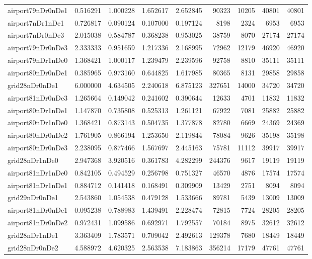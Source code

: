 \begin{longtable}{|l|r|r|r|r|r|r|r|r|}
airport79nDr0nDe1 & 0.516291 & 1.000228 & 1.652617 & 2.652845 & 90323 & 10205 & 40801 & 40801 \\
airport7nDr1nDe1 & 0.726817 & 0.090124 & 0.107000 & 0.197124 & 8198 & 2324 & 6953 & 6953 \\
airport7nDr0nDe3 & 2.015038 & 0.584787 & 0.368238 & 0.953025 & 38759 & 8070 & 27174 & 27174 \\
airport79nDr0nDe3 & 2.333333 & 0.951659 & 1.217336 & 2.168995 & 72962 & 12179 & 46920 & 46920 \\
airport79nDr1nDe0 & 1.368421 & 1.000117 & 1.239479 & 2.239596 & 92758 & 8810 & 35111 & 35111 \\
airport80nDr0nDe1 & 0.385965 & 0.973160 & 0.644825 & 1.617985 & 80365 & 8131 & 29858 & 29858 \\
grid28nDr0nDe1 & 6.000000 & 4.634505 & 2.240618 & 6.875123 & 327651 & 14000 & 34720 & 34720 \\
airport81nDr0nDe3 & 1.265664 & 0.149042 & 0.241602 & 0.390644 & 12633 & 4701 & 11832 & 11832 \\
airport80nDr1nDe1 & 1.147870 & 0.735808 & 0.525313 & 1.261121 & 67922 & 7081 & 25882 & 25882 \\
airport80nDr1nDe0 & 1.368421 & 0.873143 & 0.504735 & 1.377878 & 82780 & 6669 & 24369 & 24369 \\
airport80nDr0nDe2 & 1.761905 & 0.866194 & 1.253650 & 2.119844 & 78084 & 9626 & 35198 & 35198 \\
airport80nDr0nDe3 & 2.238095 & 0.877466 & 1.567697 & 2.445163 & 75781 & 11112 & 39917 & 39917 \\
grid28nDr1nDe0 & 2.947368 & 3.920516 & 0.361783 & 4.282299 & 244376 & 9617 & 19119 & 19119 \\
airport81nDr1nDe0 & 0.842105 & 0.494529 & 0.256798 & 0.751327 & 46570 & 4876 & 17574 & 17574 \\
airport81nDr1nDe1 & 0.884712 & 0.141418 & 0.168491 & 0.309909 & 13429 & 2751 & 8094 & 8094 \\
grid29nDr0nDe1 & 2.543860 & 1.054538 & 0.479128 & 1.533666 & 89781 & 5439 & 13009 & 13009 \\
airport81nDr0nDe1 & 0.095238 & 0.788983 & 1.439491 & 2.228474 & 72815 & 7724 & 28205 & 28205 \\
airport81nDr0nDe2 & 0.972431 & 1.099586 & 0.692971 & 1.792557 & 70184 & 8975 & 32612 & 32612 \\
grid28nDr1nDe1 & 3.363409 & 1.783571 & 0.709042 & 2.492613 & 129378 & 7680 & 18449 & 18449 \\
grid28nDr0nDe2 & 4.588972 & 4.620325 & 2.563538 & 7.183863 & 356214 & 17179 & 47761 & 47761 \\

\end{longtable}
